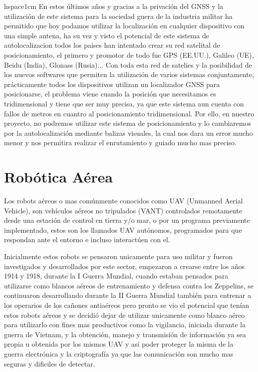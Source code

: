 hspace{1cm} En estos últimos años y gracias a la privación del GNSS y la utilización de este sistema para la sociedad guera de la industria militar ha permitido que hoy podamos utilizar la localización en cualquier dispositivo con una simple antena, ha su vez y visto el potencial de este sistema de autolocalizacion todos los paises han intentado crear su red satelital de posicionamiento, el primero y promotor de todo fue GPS (EE.UU.), Galileo (UE), Beidu (India), Glonass (Rusia)... Con toda esta red de satelies y la posibilidad de los nuevos softwares que permiten la utilización de varios sistemas conjuntamente, prácticamente todos los dispositivos utilizan un localizador GNSS para posicionarse, el problema viene cuando la posición que necesitamos es tridimensional y tiene que ser muy precisa, ya que este sistema aun cuenta con fallos de metros en cuantro al posicionamiento tridimensional. Por ello, en nuestro proyecto, no podremos utilizar este sistema de posicionamiento y lo cambiaremos por la autolocalización mediante balizas visuales, la cual nos dara un error mucho menor y nos permitira realizar el enrutamiento y guiado mucho mas preciso.


\section{Robótica Aérea}
\hspace{1cm} Los robots aéreos o mas comúnmente conocidos como UAV (Unmanned Aerial Vehicle), son vehículos aéreos no tripulados (VANT) controlados remotamente desde una estación de control en tierra y/o mar, o por un programa previamente implementado, estos son los llamados UAV autónomos, programados para que respondan ante el entorno e incluso interactúen con el.

\hspace{1cm} Inicialmente estos robots se pensaron unicamente para uso militar y fueron investigados y desarrollados por este sector, empezaron a crearse entre los años 1914 y 1918, durante la I Guerra Mundial, cuando estaban pensados para utilizarse como blancos aéreos de entrenamiento y defensa contra los Zeppelins, se continuaron desarrollando durante la II Guerra Mundial también para entrenar a los operarios de los cañones antiaéreos pero pronto se vio el potencial que tenían estos robots aéreos y se decidió dejar de utilizar unicamente como blanco aéreo para utilizarlo con fines mas productivos como la vigilancia, iniciada durante la guerra de Vietnam,  y la obtención, manejo y transmisión de información ya sea propia u obtenida por los mismos UAV y así poder proteger la misma de la guerra electrónica y la criptografía ya que las comunicación son mucho mas seguras y dificiles de detectar.

